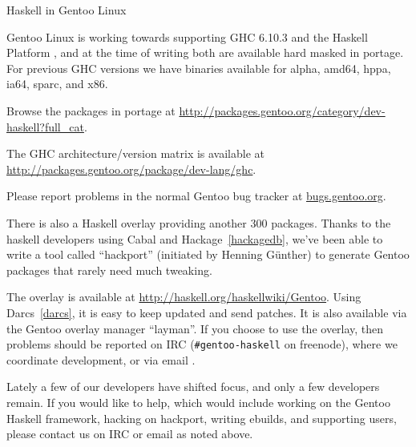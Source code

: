 \begin{hcarentry}{Haskell in Gentoo Linux}
\label{gentoo}
\makeheader

Gentoo Linux is working towards supporting GHC 6.10.3 and the Haskell
Platform %
, and at the time of writing both are available hard masked in portage.
For previous GHC versions we have binaries available for alpha, amd64, hppa,
ia64, sparc, and x86.

Browse the packages in portage at 
\url{http://packages.gentoo.org/category/dev-haskell?full\_cat}.

The GHC architecture/version matrix is available at
\url{http://packages.gentoo.org/package/dev-lang/ghc}.

Please report problems in the normal Gentoo bug tracker
at \url{bugs.gentoo.org}.

There is also a Haskell overlay providing another 300 packages. Thanks to
the haskell developers using Cabal and Hackage~\cref{hackagedb}, we've been
able to write a tool called ``hackport'' (initiated by Henning G\"unther) to
generate Gentoo packages that rarely need much tweaking.

The overlay is available at
\url{http://haskell.org/haskellwiki/Gentoo}. Using
Darcs~\cref{darcs}, it is easy to keep updated and send patches.
It is also available via the Gentoo overlay manager ``layman''.
If you choose to use the overlay, then problems should be
reported on
IRC (\verb+#gentoo-haskell+ on freenode), where we coordinate
development, or via email .

Lately a few of our developers have shifted focus, and only a few
developers remain. If you would like to help, which would include
working on the Gentoo Haskell framework, hacking on hackport, writing
ebuilds, and supporting users, please contact us on IRC or email as noted
above.
\end{hcarentry}

